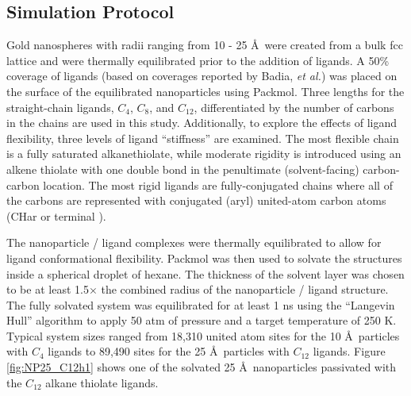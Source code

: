 \subsection{Simulation Protocol}

Gold nanospheres with radii ranging from 10 - 25 \AA\ were created
from a bulk fcc lattice and were thermally equilibrated prior to the
addition of ligands. A 50\% coverage of ligands (based on coverages
reported by Badia, \textit{et al.}\cite{Badia1996:2}) was placed on
the surface of the equilibrated nanoparticles using
Packmol\cite{packmol}. Three lengths for the
straight-chain ligands, $C_4$, $C_8$, and $C_{12}$, differentiated by
the number of carbons in the chains are used in this study.  Additionally, to explore the
effects of ligand flexibility, three levels of ligand
``stiffness'' are examined.  The most flexible chain is a fully saturated
alkanethiolate, while moderate rigidity is introduced using an alkene
thiolate with one double bond in the penultimate (solvent-facing)
carbon-carbon location.  The most rigid ligands are fully-conjugated
chains where all of the carbons are represented with conjugated (aryl)
united-atom carbon atoms (CHar or terminal ).

The nanoparticle / ligand complexes were thermally equilibrated to
allow for ligand conformational flexibility. Packmol was then used to
solvate the structures inside a spherical droplet of hexane. The
thickness of the solvent layer was chosen to be at least 1.5$\times$
the combined radius of the nanoparticle / ligand structure. The fully
solvated system was equilibrated for at least 1 ns using the
``Langevin Hull'' algorithm to apply 50 atm of pressure and a target
temperature of 250 K.\cite{Vardeman2011} Typical system sizes ranged
from 18,310 united atom sites for the 10 \AA\ particles with $C_4$
ligands to 89,490 sites for the 25 \AA\ particles with $C_{12}$
ligands.  Figure \ref{fig:NP25_C12h1} shows one of the solvated 25
\AA\ nanoparticles passivated with the $C_{12}$ alkane thiolate
ligands.

